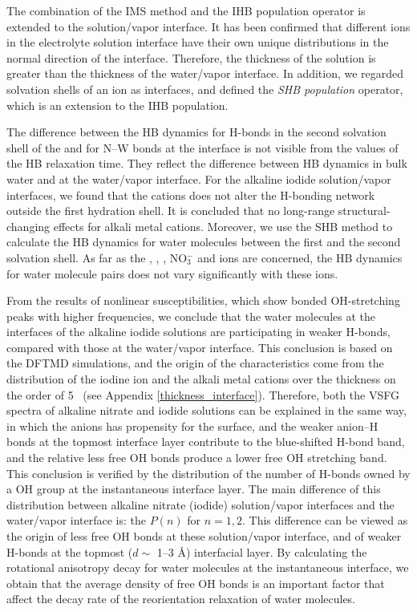 The combination of the IMS method and the IHB population operator is extended to the solution/vapor interface. 
It has been confirmed that different ions in the electrolyte solution interface have their own unique distributions in the normal direction of the interface. 
Therefore, the thickness of the solution is greater than the thickness of the water/vapor interface. 
In addition, we regarded solvation shells of an ion as interfaces, 
and defined the \emph{SHB population} operator, which is an extension to the IHB population.

The difference between the HB dynamics for H-bonds in the second solvation shell of the \Li and for N--W bonds 
at the interface is not visible from the values of the HB relaxation time. They reflect the difference between HB dynamics in 
bulk water and at the water/vapor interface. For the alkaline iodide solution/vapor interfaces, we found 
that the cations does not alter the H-bonding network outside the first hydration shell. 
It is concluded that no long-range structural-changing effects for alkali metal cations.
Moreover, we use the SHB method to calculate the HB dynamics for water molecules between the first and the second solvation shell.
As far as the \Li, \Na, \K, NO$^-_3$ and \I ions are concerned, 
the HB dynamics for water molecule pairs does not vary significantly with these ions.

From the results of nonlinear susceptibilities, which show bonded OH-stretching peaks with higher frequencies, 
we conclude that the water molecules at the interfaces of the alkaline iodide solutions are participating 
in weaker H-bonds, compared with those at the water/vapor interface. 
This conclusion is based on the DFTMD simulations, and %
the origin of the characteristics come from the distribution of the iodine ion and the alkali metal cations
over the thickness on the order of 5 \A\ (see Appendix \ref{thickness_interface}).
Therefore, both the VSFG spectra of alkaline nitrate and iodide solutions can be explained in the same way, 
in which the anions has propensity for the surface, and the weaker anion--H bonds at the topmost interface layer contribute to the blue-shifted H-bond band,
and the relative less free OH bonds produce a lower free OH stretching band.
This conclusion is verified by the distribution of the number of H-bonds owned by a OH group at the instantaneous interface layer. 
The main difference of this distribution between alkaline nitrate (iodide) solution/vapor interfaces and the water/vapor interface is:
the $P(n)$ for $n= 1, 2$. This difference can be viewed as the origin of less free OH bonds at these solution/vapor interface, 
and of weaker H-bonds at the topmost ($d \sim$ 1--3 \AA) interfacial layer.
By calculating the rotational anisotropy decay for water molecules at the instantaneous interface, 
we obtain that the average density of free OH bonds is an important factor that affect the decay rate of the reorientation relaxation of water molecules.

